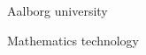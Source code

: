 \begin{titlepage}
	\vspace{0.5\baselineskip} %
	
	
	
	\vfill %
	
	
	
	
	\vspace{0.3\baselineskip} %
	
	\large Aalborg university %
	
	{\large Mathematics technology} %

\end{titlepage}
